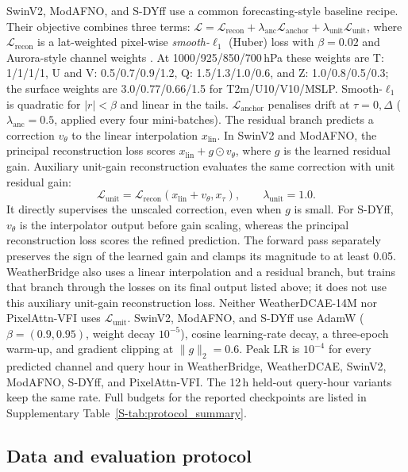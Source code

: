 \documentclass[referee,lineno,pdflatex,sn-nature]{sn-jnl}
\begin{document}
\begin{deferredmethodsrest}
SwinV2, ModAFNO, and S-DYff use a common forecasting-style baseline recipe.
Their objective combines three terms:
$\mathcal{L} = \mathcal{L}_{\text{recon}}
+ \lambda_{\text{anc}} \mathcal{L}_{\text{anchor}}
+ \lambda_{\text{unit}} \mathcal{L}_{\text{unit}}$,
where $\mathcal{L}_{\text{recon}}$ is a lat-weighted pixel-wise
\emph{smooth-$\ell_1$} (Huber) loss with $\beta{=}0.02$ and Aurora-style
channel weights \cite{bodnar2024aurora}. At 1000/925/850/700\,hPa these
weights are T: 1/1/1/1, U and V: 0.5/0.7/0.9/1.2,
Q: 1.5/1.3/1.0/0.6, and Z: 1.0/0.8/0.5/0.3; the surface weights are
3.0/0.77/0.66/1.5 for T2m/U10/V10/MSLP. Smooth-$\ell_1$ is quadratic for
$|r|<\beta$ and linear in the tails.
$\mathcal{L}_{\text{anchor}}$ penalises drift at $\tau{=}0, \Delta$
($\lambda_{\text{anc}}{=}0.5$, applied every four mini-batches).
The residual branch predicts a correction $v_\theta$ to the linear
interpolation $x_{\mathrm{lin}}$. In SwinV2 and ModAFNO, the principal
reconstruction loss scores $x_{\mathrm{lin}}+g\odot v_\theta$, where $g$ is
the learned residual gain. Auxiliary unit-gain reconstruction evaluates
the same correction with unit residual gain:
\[
\mathcal{L}_{\text{unit}}
 =\mathcal{L}_{\text{recon}}(x_{\mathrm{lin}}+v_\theta,x_\tau),
\qquad \lambda_{\text{unit}}=1.0.
\]
It directly supervises the unscaled correction, even when $g$ is small.
For S-DYff, $v_\theta$ is the interpolator output before gain scaling,
whereas the principal reconstruction loss scores the refined prediction.
The forward pass separately preserves the sign of the learned gain and
clamps its magnitude to at least 0.05.
WeatherBridge also uses a linear interpolation and a residual branch, but
trains that branch through the losses on its final output listed above;
it does not use this auxiliary unit-gain reconstruction loss. Neither
WeatherDCAE-14M nor PixelAttn-VFI uses $\mathcal{L}_{\text{unit}}$.
SwinV2, ModAFNO, and S-DYff use AdamW
($\beta=(0.9,0.95)$, weight decay $10^{-5}$),
cosine learning-rate decay, a three-epoch warm-up, and gradient clipping
at $\|g\|_2=0.6$. Peak LR is $10^{-4}$ for every predicted channel and query
hour in WeatherBridge, WeatherDCAE, SwinV2, ModAFNO,
S-DYff, and PixelAttn-VFI. The 12\,h held-out query-hour variants keep the same rate.
Full budgets for the reported checkpoints are listed in Supplementary
Table~\ref{S-tab:protocol_summary}.

\subsection{Data and evaluation protocol}
\label{sec:setup}


\end{deferredmethodsrest}
\end{document}

